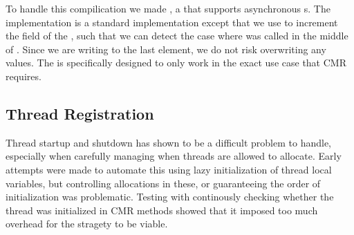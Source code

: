To handle this compilication we made , a  that supports asynchronous
s. The implementation is a standard  implementation except that we use
 to increment the  field of the , such that we can detect
the case where  was called in the middle of . Since we are writing to the
last element, we do not risk overwriting any values. The  is specifically designed
to only work in the exact use case that CMR requires.


\subsection{Thread Registration}

Thread startup and shutdown has shown to be a difficult problem to handle, especially when
carefully managing when threads are allowed to allocate. Early attempts were made to automate this
using lazy initialization of thread local variables, but controlling allocations in these, or
guaranteeing the order of initialization was problematic. Testing with continously checking whether
the thread was initialized in CMR methods showed that it imposed too much overhead for the stragety
to be viable.









